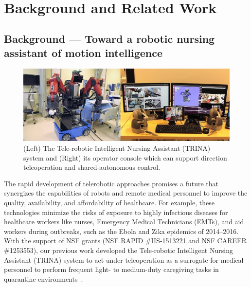 \documentclass[letterpaper, 11 pt, onecolumn]{article}
\begin{document}
\section{Background and Related Work}\label{sec:related}

\subsection{Background --- Toward a robotic nursing assistant of motion intelligence}\label{sec:related-TRINA}

\begin{figure}
  \includegraphics[width=0.99\linewidth]{fig//TRINA_system}
    \caption{(Left) The Tele-robotic Intelligent Nursing Assistant (TRINA) system and (Right) its operator console which can support direction teleoperation and shared-autonomous control.}
    \label{fig:Trina}
\end{figure}

\noindent
The rapid development of telerobotic approaches promises a future that synergizes the capabilities of robots and remote medical personnel to improve the quality, availability, and affordability of healthcare. For example, these technologies minimize the risks of exposure to highly infectious diseases for  healthcare workers like nurses, Emergency Medical Technicians (EMTs), and aid workers during outbreaks, such as the Ebola and Zika epidemics of 2014--2016. With the support of NSF grants (NSF RAPID \#IIS-1513221 and NSF CAREER \#1253553), our previous work developed the Tele-robotic Intelligent Nursing Assistant (TRINA) system to act under teleoperation as a surrogate for medical personnel to perform frequent light- to medium-duty caregiving tasks in quarantine environments~\cite{Hauser_Li_TRINA:17}.
\end{document}
